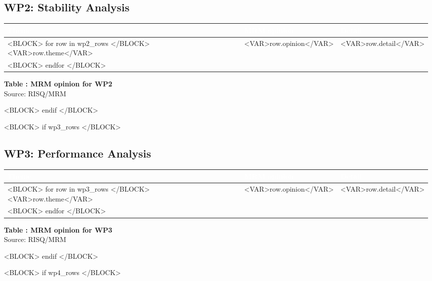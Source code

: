 \documentclass[10pt, a4paper]{article}
\newcounter{tableCounter}
\begin{document}
\subsection{WP2: Stability Analysis}
\noindent\begin{tabularx}{\textwidth}{|>{\centering\arraybackslash}p{3.5cm}|>{\centering\arraybackslash}p{3.5cm}|X|}
\hline
\rowcolor{sgred}
\centering\textcolor{white}{\textbf{Theme}} & \centering\textcolor{white}{\textbf{MRM opinion}} & \centering\arraybackslash\textcolor{white}{\textbf{Detail}} \\
\hline
<BLOCK> for row in wp2_rows </BLOCK>
<VAR>row.theme</VAR> & <VAR>row.opinion</VAR> & <VAR>row.detail</VAR> \\
\hline
<BLOCK> endfor </BLOCK>
\end{tabularx}
\begin{center}
\scriptsize \textbf{Table \thetableCounter: MRM opinion for WP2} \\
Source: RISQ/MRM
\end{center}
\vspace{0.3cm}
<BLOCK> endif </BLOCK>

<BLOCK> if wp3_rows </BLOCK>
\subsection{WP3: Performance Analysis}
\noindent\begin{tabularx}{\textwidth}{|>{\centering\arraybackslash}p{3.5cm}|>{\centering\arraybackslash}p{3.5cm}|X|}
\hline
\rowcolor{sgred}
\centering\textcolor{white}{\textbf{Theme}} & \centering\textcolor{white}{\textbf{MRM opinion}} & \centering\arraybackslash\textcolor{white}{\textbf{Detail}} \\
\hline
<BLOCK> for row in wp3_rows </BLOCK>
<VAR>row.theme</VAR> & <VAR>row.opinion</VAR> & <VAR>row.detail</VAR> \\
\hline
<BLOCK> endfor </BLOCK>
\end{tabularx}
\begin{center}
\scriptsize \textbf{Table \thetableCounter: MRM opinion for WP3} \\
Source: RISQ/MRM
\end{center}
\vspace{0.3cm}
<BLOCK> endif </BLOCK>

<BLOCK> if wp4_rows </BLOCK>
\end{document}

